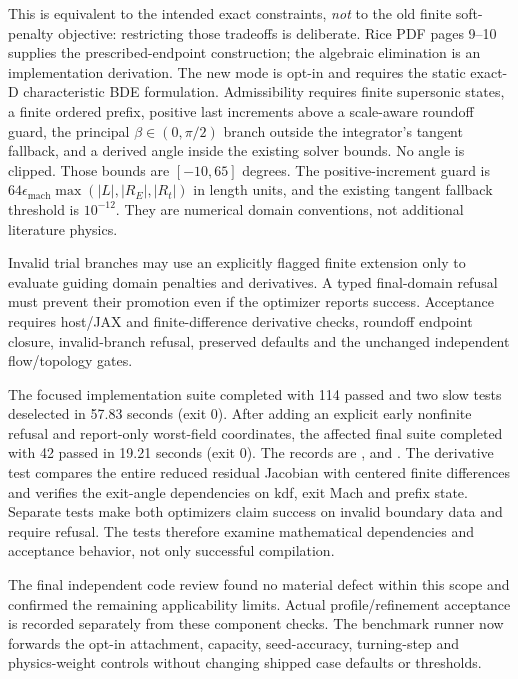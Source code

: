 This is equivalent to the intended exact constraints, \emph{not} to the old
finite soft-penalty objective: restricting those tradeoffs is deliberate.
Rice PDF pages 9--10 supplies the prescribed-endpoint construction; the
algebraic elimination is an implementation derivation. The new mode is
opt-in and requires the static exact-D characteristic BDE formulation.
Admissibility requires finite supersonic states, a finite ordered prefix,
positive last increments above a scale-aware roundoff guard, the principal
$\beta\in(0,\pi/2)$ branch outside the integrator's tangent fallback, and
a derived angle inside the existing solver bounds. No angle is clipped.
Those bounds are $[-10,65]$ degrees. The positive-increment guard is
$64\epsilon_{\mathrm{mach}}\max(|L|,|R_E|,|R_t|)$ in length units,
and the existing tangent fallback threshold is $10^{-12}$. They are
numerical domain conventions, not additional literature physics.

Invalid trial branches may use an explicitly flagged finite extension only
to evaluate guiding domain penalties and derivatives. A typed final-domain
refusal must prevent their promotion even if the optimizer reports success.
Acceptance requires host/JAX and finite-difference derivative checks,
roundoff endpoint closure, invalid-branch refusal, preserved defaults and
the unchanged independent flow/topology gates.

The focused implementation suite completed with 114 passed and two slow tests
deselected in 57.83 seconds (exit 0). After adding an explicit early nonfinite
refusal and report-only worst-field coordinates, the affected final suite
completed with 42 passed in 19.21 seconds (exit 0). The records are
,  and
. The derivative test compares the
entire reduced residual Jacobian with centered finite differences and verifies
the exit-angle dependencies on kdf, exit Mach and prefix state. Separate tests
make both optimizers claim success on invalid boundary data and require refusal.
The tests therefore examine mathematical dependencies and acceptance behavior,
not only successful compilation.

The final independent code review found no material defect within
this scope and confirmed the remaining applicability limits. Actual
profile/refinement acceptance is recorded separately from these component
checks. The benchmark runner now
forwards the opt-in attachment, capacity, seed-accuracy, turning-step and
physics-weight controls without changing shipped case defaults or thresholds.

